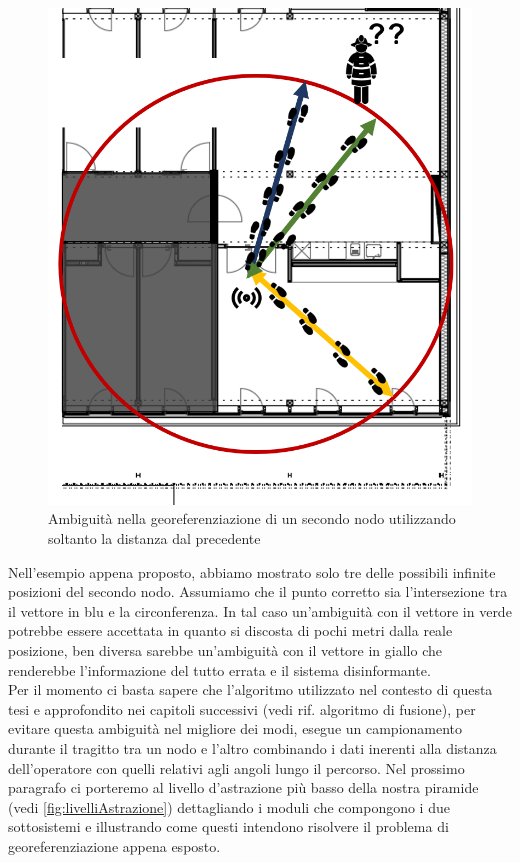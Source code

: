 \begin{figure}[H]
	\centering
	\includegraphics[scale=0.4]{DescrizioneDelSistema/ambiguitDistanza.png}
	\caption{Ambiguità nella georeferenziazione di un secondo nodo utilizzando soltanto la distanza dal precedente }
	\label{fig:ambiguitDistanz}
\end{figure}
Nell'esempio appena proposto, abbiamo mostrato solo tre delle possibili infinite posizioni del secondo nodo. Assumiamo che il punto corretto sia l'intersezione tra il vettore in blu e la circonferenza. In tal caso un'ambiguità con il vettore in verde potrebbe essere accettata in quanto si discosta di pochi metri dalla reale posizione, ben diversa sarebbe un'ambiguità con il vettore in giallo che renderebbe l'informazione del tutto errata e il sistema disinformante.\\
Per il momento ci basta sapere che l'algoritmo utilizzato nel contesto di questa tesi e approfondito nei capitoli successivi (vedi rif. algoritmo di fusione), per evitare questa ambiguità nel migliore dei modi, esegue un campionamento durante il tragitto tra un nodo e l'altro combinando i dati inerenti alla distanza dell'operatore con quelli relativi agli angoli lungo il percorso.\newpage
Nel prossimo paragrafo ci porteremo al livello d'astrazione più basso della nostra piramide (vedi \ref{fig:livelliAstrazione}) dettagliando i moduli che compongono i due sottosistemi e illustrando come questi intendono risolvere il problema di georeferenziazione appena esposto.


